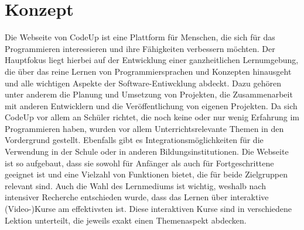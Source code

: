 \documentclass[main.tex]{subfiles}
\begin{document}
    \section{Konzept}
    Die Webseite von CodeUp ist eine Plattform für Menschen, die sich für das Programmieren interessieren und ihre Fähigkeiten verbessern möchten.
    Der Hauptfokus liegt hierbei auf der Entwicklung einer ganzheitlichen Lernumgebung, die über das reine Lernen von Programmiersprachen und Konzepten hinausgeht und alle wichtigen Aspekte der Software-Entiwcklung abdeckt.
    Dazu gehören unter anderem die Planung und Umsetzung von Projekten, die Zusammenarbeit mit anderen Entwicklern und die Veröffentlichung von eigenen Projekten.
    Da sich CodeUp vor allem an Schüler richtet, die noch keine oder nur wenig Erfahrung im Programmieren haben, wurden vor allem Unterrichtsrelevante Themen in den Vordergrund gestellt.
    Ebenfalls gibt es Integrationsmöglichkeiten für die Verwendung in der Schule oder in anderen Bildungsinstitutionen.
    Die Webseite ist so aufgebaut, dass sie sowohl für Anfänger als auch für Fortgeschrittene geeignet ist und eine Vielzahl von Funktionen bietet, die für beide Zielgruppen relevant sind.
    Auch die Wahl des Lernmediums ist wichtig, weshalb nach intensiver Recherche entschieden wurde, dass das Lernen über interaktive (Video-)Kurse am effektivsten ist.
    Diese interaktiven Kurse sind in verschiedene Lektion unterteilt, die jeweils exakt einen Themenaspekt abdecken.
\end{document}
